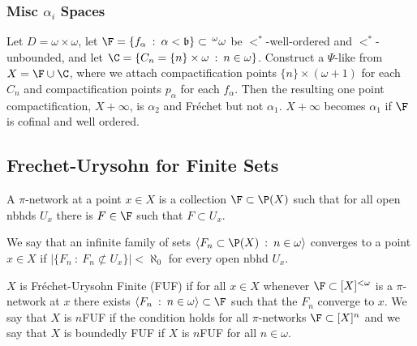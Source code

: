 \documentclass{article}
\begin{document}
\subsubsection{Misc \(\alpha_i\) Spaces}

\begin{exam}
     Let \(D = \omega\times\omega\), let \(\F = \{f_{\alpha} \: : \: \alpha < \mathfrak{b}\} \subset \, ^\omega\omega\) be \(<^{\ast}\)-well-ordered and \(<^{\ast}\)-unbounded, and let \(\C = \{C_n = \{n\} \times \omega \: : \: n \in \omega\}\). Construct a \(\Psi\)-like from \(X = \F \cup \C\), where we attach compactification points \(\{n\} \times (\omega+1)\) for each \(C_n\) and compactification points \(p_{\alpha}\) for each \(f_{\alpha}\). Then the resulting one point compactification, \(X + \infty\), is \(\alpha_2\) and Fréchet but not \(\alpha_1\). \(X + \infty\) becomes \(\alpha_1\) if \(\F\) is cofinal and well ordered. 
\end{exam}

\subsection{Frechet-Urysohn for Finite Sets}

\begin{defn}
    A \(\pi\)-network at a point \(x \in X\) is a collection \(\F \subset \P(X)\) such that for all open nbhds \(U_x\) there is \(F \in \F\) such that \(F \subset U_x\).
\end{defn}
\begin{defn}
    We say that an infinite family of sets  \(\langle F_n \subset \P(X) \: : \: n \in \omega\rangle\) converges to a point \(x \in X\) if \(|\{F_n \: : \: F_n \not \subset U_x\}| < \aleph_0\) for every open nbhd \(U_x\). 
\end{defn}
\begin{defn}
    \(X\) is Fréchet-Urysohn Finite (FUF) if for all \(x \in X\) whenever \(\F \subset [X]^{<\omega}\) is a \(\pi\)-network at \(x\) there exists \(\langle F_n \: : \: n \in \omega\rangle \subset \F\) such that the \(F_n\) converge to \(x\). We say that \(X\) is \(n\)FUF if the condition holds for all \(\pi\)-networks \(\F \subset [X]^n\) and we say that \(X\) is boundedly FUF if \(X\) is \(n\)FUF for all \(n \in \omega\).
\end{defn}
\end{document}
